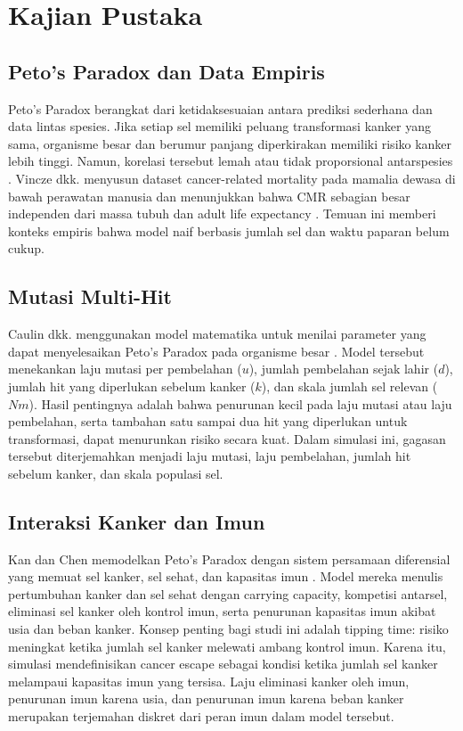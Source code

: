 \section{Kajian Pustaka}

\subsection{Peto's Paradox dan Data Empiris}

Peto's Paradox berangkat dari ketidaksesuaian antara prediksi sederhana dan
data lintas spesies. Jika setiap sel memiliki peluang transformasi kanker yang
sama, organisme besar dan berumur panjang diperkirakan memiliki risiko kanker
lebih tinggi. Namun, korelasi tersebut lemah atau tidak proporsional
antarspesies \cite{caulin2011}. Vincze dkk. menyusun dataset cancer-related
mortality pada mamalia dewasa di bawah perawatan manusia dan menunjukkan bahwa
CMR sebagian besar independen dari massa tubuh dan adult life expectancy
\cite{vincze2022}. Temuan ini memberi konteks empiris bahwa model naif berbasis
jumlah sel dan waktu paparan belum cukup.

\subsection{Mutasi Multi-Hit}

Caulin dkk. menggunakan model matematika untuk menilai parameter yang dapat
menyelesaikan Peto's Paradox pada organisme besar \cite{caulin2015}. Model
tersebut menekankan laju mutasi per pembelahan ($u$), jumlah pembelahan sejak
lahir ($d$), jumlah hit yang diperlukan sebelum kanker ($k$), dan skala jumlah
sel relevan ($Nm$). Hasil pentingnya adalah bahwa penurunan kecil pada laju
mutasi atau laju pembelahan, serta tambahan satu sampai dua hit yang diperlukan
untuk transformasi, dapat menurunkan risiko secara kuat. Dalam simulasi ini,
gagasan tersebut diterjemahkan menjadi laju mutasi, laju pembelahan, jumlah hit
sebelum kanker, dan skala populasi sel.

\subsection{Interaksi Kanker dan Imun}

Kan dan Chen memodelkan Peto's Paradox dengan sistem persamaan diferensial
yang memuat sel kanker, sel sehat, dan kapasitas imun \cite{kan2024}. Model
mereka menulis pertumbuhan kanker dan sel sehat dengan carrying capacity,
kompetisi antarsel, eliminasi sel kanker oleh kontrol imun, serta penurunan kapasitas imun
akibat usia dan beban kanker. Konsep penting bagi studi ini adalah tipping time:
risiko meningkat ketika jumlah sel kanker melewati ambang kontrol imun. Karena
itu, simulasi mendefinisikan cancer escape sebagai kondisi ketika jumlah sel
kanker melampaui kapasitas imun yang tersisa. Laju eliminasi kanker oleh imun,
penurunan imun karena usia, dan penurunan imun karena beban kanker merupakan
terjemahan diskret dari peran imun dalam model tersebut.

